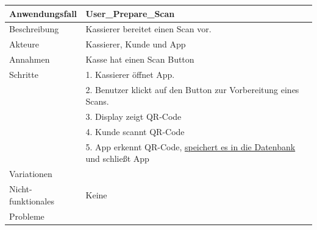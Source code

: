 \begin{enumerate}[(a)]
\begin{enumerate}[1.]
\begin{tabular}{l|l}
        \end{tabular}
        
        
        \begin{tabular}{l|l}
            Anwendungsfall &  User\_Prepare\_Scan \\ 
            \hline  
            Beschreibung & Kassierer bereitet einen Scan vor. \\
            \hline  
            Akteure & Kassierer, Kunde und App \\
            \hline  
           Annahmen & Kasse hat einen Scan Button \\
            \hline  
            Schritte & 1. Kassierer öffnet App. \\
            & 2. Benutzer klickt auf den Button zur Vorbereitung eines Scans. \\
            & 3. Display zeigt QR-Code \\
            & 4. Kunde scannt QR-Code \\
            & 5. App erkennt QR-Code, \underline{speichert es in die Datenbank} und schließt App\\
            \hline  
            Variationen &  \\
            \hline  
            Nicht-funktionales & Keine \\
            \hline  
            Probleme &  \\
            \hline  
 
        \end{tabular}


\end{enumerate}
\end{enumerate}
